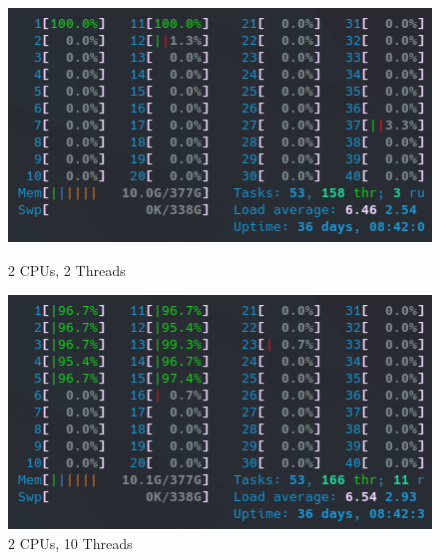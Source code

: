 \begin{figure}[!h]
    \centering
    \captionsetup{width=.48\linewidth}
    \begin{minipage}[t]{0.48\textwidth}
        \includegraphics[width=\textwidth]{figures/htop_cpus/2CPUs_2Threads.png}
        \caption{2 CPUs, 2 Threads}\label{fig:2CPUs_2Threads}
    \end{minipage}
    \hspace{0.4cm}
    \centering
    \captionsetup{width=.48\linewidth}
    \begin{minipage}[t]{0.48\textwidth}
        \includegraphics[width=\textwidth]{figures/htop_cpus/2CPUs_10Threads.png}
        \caption{2 CPUs, 10 Threads}\label{fig:2CPUs_10Threads}
    \end{minipage}


\end{figure}
